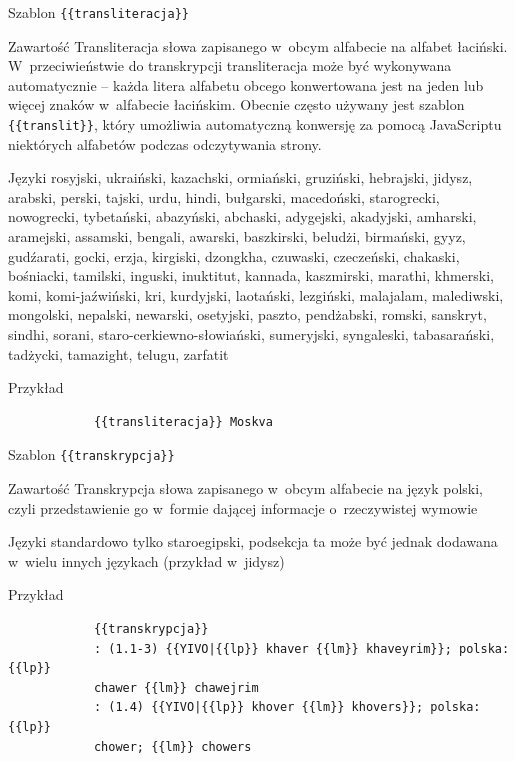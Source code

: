 \documentclass{pracamgr}
\newcommand{\spacer}{
	\begin{center}
		\textasteriskcentered
	\end{center}
}
\newenvironment{description-sub}[0]{
	\begin{basedescript}{\desclabelstyle{\pushlabel}\desclabelwidth{6em}}\setlength{\itemsep}{-2mm}
}{
	\end{basedescript}
}
\begin{document}
\begin{description-sub}
	\item[Szablon] \verb|{{transliteracja}}|
	\item[Zawartość] Transliteracja słowa zapisanego w~obcym alfabecie na alfabet łaciński. W~przeciwieństwie do transkrypcji transliteracja może być wykonywana automatycznie -- każda litera alfabetu obcego konwertowana jest na jeden lub więcej znaków w~alfabecie łacińskim. Obecnie często używany jest szablon \verb|{{translit}}|, który umożliwia automatyczną konwersję za pomocą JavaScriptu niektórych alfabetów podczas odczytywania strony.
	\item[Języki] rosyjski, ukraiński, kazachski, ormiański, gruziński, hebrajski, jidysz, arabski, perski, tajski, urdu, hindi, bułgarski, macedoński, starogrecki, nowogrecki, tybetański, abazyński, abchaski, adygejski, akadyjski, amharski, aramejski, assamski, bengali, awarski, baszkirski, beludżi, birmański, gyyz, gudźarati, gocki, erzja, kirgiski, dzongkha, czuwaski, czeczeński, chakaski, bośniacki, tamilski, inguski, inuktitut, kannada, kaszmirski, marathi, khmerski, komi, komi\hyp{}jaźwiński, kri, kurdyjski, laotański, lezgiński, malajalam, malediwski, mongolski, nepalski, newarski, osetyjski, paszto, pendżabski, romski, sanskryt, sindhi, sorani, staro-cerkiewno-słowiański, sumeryjski, syngaleski, tabasarański, tadżycki, tamazight, telugu, zarfatit
	\item[Przykład]
		\begin{verbatim}
			{{transliteracja}} Moskva
		\end{verbatim}
\end{description-sub}
\spacer
\begin{description-sub}
	\item[Szablon] \verb|{{transkrypcja}}|
	\item[Zawartość] Transkrypcja słowa zapisanego w~obcym alfabecie na język polski, czyli przedstawienie go w~formie dającej informacje o~rzeczywistej wymowie
	\item[Języki] standardowo tylko staroegipski, podsekcja ta może być jednak dodawana w~wielu innych językach (przykład w~jidysz)
	\item[Przykład]
		\begin{verbatim}
			{{transkrypcja}}
			: (1.1-3) {{YIVO|{{lp}} khaver {{lm}} khaveyrim}}; polska: {{lp}}
			chawer {{lm}} chawejrim
			: (1.4) {{YIVO|{{lp}} khover {{lm}} khovers}}; polska: {{lp}}
			chower; {{lm}} chowers
		\end{verbatim}
\end{description-sub}
\end{document}
